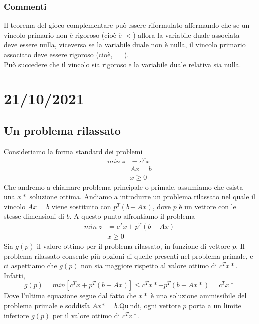 \documentclass[12pt,a4paper]{article}
\begin{document}
\subsubsection{Commenti}
Il teorema del gioco complementare può essere riformulato affermando che se un vincolo primario non è rigoroso (cioè è $<$) allora la variabile duale associata deve essere nulla, viceversa se la variabile duale non è nulla, il vincolo primario associato deve essere rigoroso (cioè, $=$).\\
Può succedere che il vincolo sia rigoroso e la variabile duale relativa sia nulla.

\clearpage
\section{21/10/2021}
\subsection{Un problema rilassato}
Consideriamo la forma standard dei problemi
$$\begin{array}{rl}
min\ z & = c^Tx\\
& Ax = b\\
& x \geq 0
\end{array}$$
Che andremo a chiamare problema principale o primale, assumiamo che esista una $x*$ soluzione ottima. Andiamo a introdurre un problema rilassato nel quale il vincolo $Ax=b$ viene sostituito con $p^T(b-Ax)$, dove $p$ è un vettore con le stesse dimensioni di $b$. A questo punto affrontiamo il problema 
$$\begin{array}{rl}
min\ z & = c^Tx+p^T(b-Ax)\\
& x \geq 0
\end{array}$$
Sia $g(p)$ il valore ottimo per il problema rilassato, in funzione di vettore $p$. Il problema rilassato consente più opzioni di quelle presenti nel problema primale, e ci aspettiamo che $g(p)$ non sia maggiore rispetto al valore ottimo di $c^Tx*$. Infatti,
$$g(p)=min[c^Tx+p^T(b-Ax)] \leq c^Tx* + p^T(b-Ax*) = c^Tx*$$
Dove l'ultima equazione segue dal fatto che $x*$ è una soluzione ammissibile del problema primale e soddisfa $Ax*=b$.Quindi, ogni vettore $p$ porta a un limite inferiore $g(p)$ per il valore ottimo di $c^Tx*$.
\end{document}
